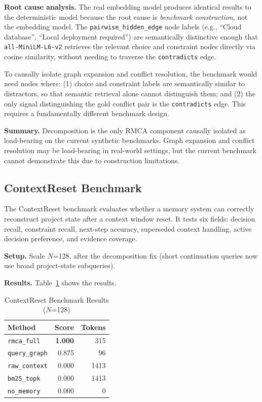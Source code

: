 \documentclass[conference]{IEEEtran}
\begin{document}
\textbf{Root cause analysis.} The real embedding model produces identical results to the
deterministic model because the root cause is \emph{benchmark construction}, not the
embedding model. The \texttt{pairwise\_hidden\_edge} node labels (e.g., ``Cloud database'',
``Local deployment required'') are semantically distinctive enough that
\texttt{all-MiniLM-L6-v2} retrieves the relevant choice and constraint nodes directly via
cosine similarity, without needing to traverse the \texttt{contradicts} edge.

To causally isolate graph expansion and conflict resolution, the benchmark would need nodes
where: (1) choice and constraint labels are semantically similar to distractors, so that
semantic retrieval alone cannot distinguish them; and (2) the only signal distinguishing the
gold conflict pair is the \texttt{contradicts} edge. This requires a fundamentally different
benchmark design.

\textbf{Summary.} Decomposition is the only RMCA component causally isolated as
load-bearing on the current synthetic benchmarks. Graph expansion and conflict resolution
may be load-bearing in real-world settings, but the current benchmark cannot demonstrate
this due to construction limitations.

\subsection{ContextReset Benchmark}

The ContextReset benchmark evaluates whether a memory system can correctly reconstruct
project state after a context window reset. It tests six fields: decision recall,
constraint recall, next-step accuracy, superseded context handling, active decision
preference, and evidence coverage.

\textbf{Setup.} Scale $N$=128, after the decomposition fix (short continuation queries
now use broad project-state subqueries).

\textbf{Results.} Table~\ref{tab:context_reset} shows the results.

\begin{table}[htbp]
\caption{ContextReset Benchmark Results ($N$=128)}
\label{tab:context_reset}
\centering
\begin{tabular}{lrr}
\toprule
\textbf{Method} & \textbf{Score} & \textbf{Tokens} \\
\midrule
\texttt{rmca\_full}  & \textbf{1.000} & 315 \\
\texttt{query\_graph} & 0.875 & 96 \\
\texttt{raw\_context} & 0.000 & 1413 \\
\texttt{bm25\_topk}  & 0.000 & 1413 \\
\texttt{no\_memory}  & 0.000 & 0 \\
\bottomrule
\end{tabular}
\end{table}
\end{document}
